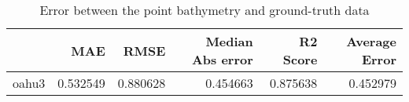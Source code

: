 \begin{table}[h!]
\caption{Error between the point bathymetry and ground-truth data}
\label{tab:oahu3_lidar_error}
\begin{tabular}{lrrrrr}
\toprule
 & MAE & RMSE & Median Abs error & R2 Score & Average Error \\
\midrule
oahu3 & 0.532549 & 0.880628 & 0.454663 & 0.875638 & 0.452979 \\
\bottomrule
\end{tabular}
\end{table}
